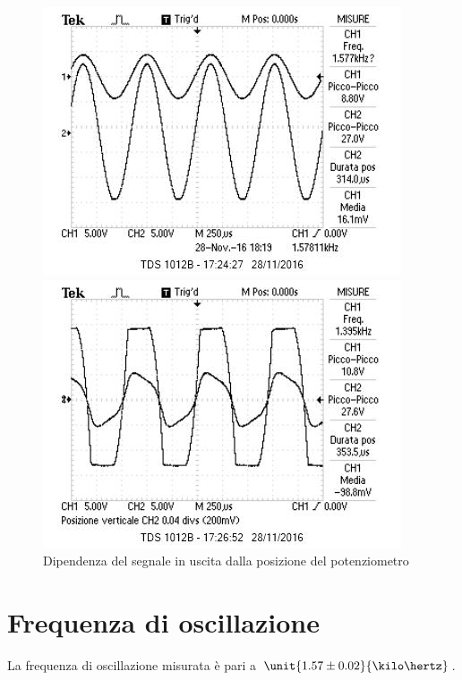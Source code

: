 \documentclass[10pt,a4paper]{article}
\begin{document}
\begin{figure}[H]
    \centering
    \begin{minipage}{0.49\textwidth}
	    \includegraphics[width=\textwidth]{../oscilloscopio/punto5.jpg}
    \end{minipage}
    \begin{minipage}{0.49\textwidth}
        \includegraphics[width=\textwidth]{../oscilloscopio/punto5(scazzo).jpg}
    \end{minipage}
    \caption{Dipendenza del segnale in uscita dalla posizione del potenziometro}
    \label{fig:dippot}
\end{figure}

\section{Frequenza di oscillazione}
La frequenza di oscillazione misurata è pari a $\unit{1.57 \pm 0.02}{\kilo\hertz}$.
\end{document}
